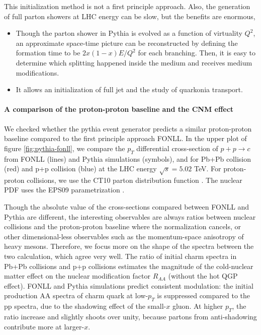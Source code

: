 This initialization method is not a first principle approach. 
Also, the generation of full parton showers at LHC energy can be slow, but the benefits are enormous,
\begin{itemize}
\item Though the parton shower in Pythia is evolved as a function of virtuality $Q^2$, an approximate space-time picture can be reconstructed by defining the formation time to be $2x(1-x)E/Q^2$ for each branching. Then, it is easy to determine which splitting happened inside the medium and receives medium modifications.
\item It allows an initialization of full jet and the study of quarkonia transport.
\end{itemize}

\paragraph{A comparison of the proton-proton baseline and the CNM effect}
We checked whether the pythia event generator predicts a similar proton-proton baseline compared to the first principle approach FONLL.
In the upper plot of figure \ref{fig:pythia-fonll}, we compare the $p_T$ differential cross-section of $p+p\rightarrow c$ from FONLL (lines) and Pythia simulations (symbols), and for Pb+Pb collision (red) and p+p collision (blue) at the LHC energy $\sqrt{s}=5.02$ TeV.
For proton-proton collisions, we use the CT10 parton distribution function \cite{Lai:2010vv}.
The nuclear PDF uses the EPS09 parametrization \cite{Eskola:2009uj}.

Though the absolute value of the cross-sections compared between FONLL and Pythia are different, the interesting observables are always ratios between nuclear collisions and the proton-proton baseline where the normalization cancels, or other dimensional-less observables such as the momentum-space anisotropy of heavy mesons.
Therefore, we focus more on the shape of the spectra between the two calculation, which agree very well.
The ratio of initial charm spectra in Pb+Pb collisions and p+p collisions estimates the magnitude of the cold-nuclear matter effect on the nuclear modification factor $R_{AA}$ (without the hot QGP effect).
FONLL and Pythia simulations predict consistent modulation: the initial production AA spectra of charm quark at low-$p_T$ is suppressed compared to the pp spectra, due to the shadowing effect of the small-$x$ gluon. 
At higher $p_T$, the ratio increase and slightly shoots over unity, because partons from anti-shadowing contribute more at larger-$x$.


